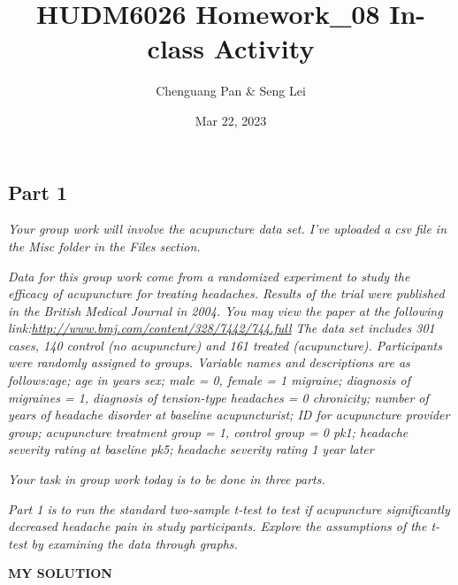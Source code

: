 \documentclass[
]{article}
\title{HUDM6026 Homework\_08 In-class Activity}
\author{Chenguang Pan \& Seng Lei}
\date{Mar 22, 2023}
\begin{document}
\maketitle

\hypertarget{part-1}{%
\subsection{Part 1}\label{part-1}}

\emph{Your group work will involve the acupuncture data set. I've
uploaded a csv file in the Misc folder in the Files section.}

\emph{Data for this group work come from a randomized experiment to
study the efficacy of acupuncture for treating headaches. Results of the
trial were published in the British Medical Journal in 2004. You may
view the paper at the following
link:\url{http://www.bmj.com/content/328/7442/744.full} The data set
includes 301 cases, 140 control (no acupuncture) and 161 treated
(acupuncture). Participants were randomly assigned to groups. Variable
names and descriptions are as follows:age; age in years sex; male = 0,
female = 1 migraine; diagnosis of migraines = 1, diagnosis of
tension-type headaches = 0 chronicity; number of years of headache
disorder at baseline acupuncturist; ID for acupuncture provider group;
acupuncture treatment group = 1, control group = 0 pk1; headache
severity rating at baseline pk5; headache severity rating 1 year later}

\emph{Your task in group work today is to be done in three parts.}

\emph{Part 1 is to run the standard two-sample t-test to test if
acupuncture significantly decreased headache pain in study participants.
Explore the assumptions of the t-test by examining the data through
graphs.}

\textbf{MY SOLUTION}
\end{document}
